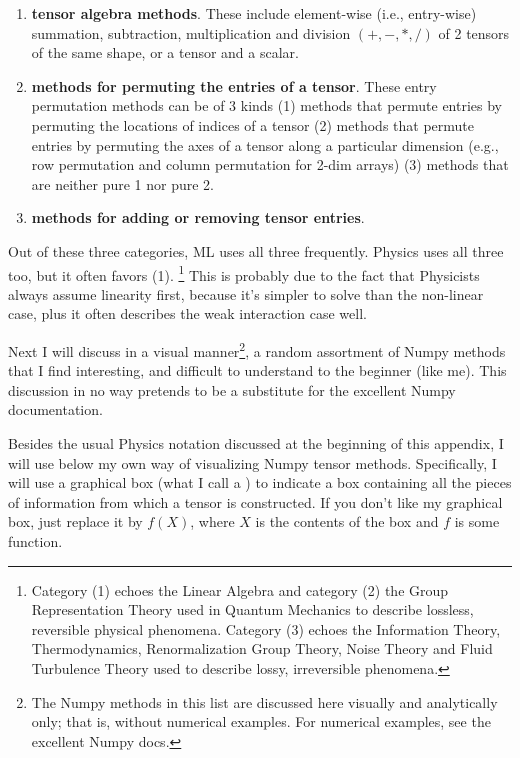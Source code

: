 \begin{enumerate}

\item {\bf tensor algebra methods}. These include
element-wise (i.e., entry-wise) summation, subtraction, multiplication and
division $(+,-,*,/)$ of 2 tensors of the same shape, or a tensor and a scalar.

\item
{\bf methods
for permuting  the entries of a tensor}. These
 entry permutation methods
 can be of 3 kinds
 (1) methods that
 permute entries by permuting the  locations of indices of a tensor
 (2) methods  that
 permute entries by permuting the  axes
 of a tensor along
 a particular dimension
 (e.g., row permutation and column permutation for 2-dim arrays)
(3) methods that
are neither pure 1 nor pure 2.

\item {\bf methods for adding or
removing tensor entries}.
\end{enumerate}
Out of these three categories, ML uses all three frequently.  Physics uses all three too, but it often favors (1). \footnote{
Category (1) echoes the Linear Algebra and category (2) the Group Representation Theory used in Quantum Mechanics to describe lossless, reversible physical phenomena. Category (3) echoes the Information Theory, Thermodynamics, Renormalization Group Theory, Noise Theory and Fluid Turbulence Theory used to describe lossy, irreversible phenomena.} This is
probably due to the fact
that Physicists always assume linearity  first, because it's  simpler to solve than the non-linear case, plus it often describes the weak interaction case well.

Next I will discuss in a visual manner\footnote{The Numpy methods in this list are discussed here visually and analytically only; that is, without numerical examples. For numerical examples, see the excellent Numpy docs.}, a random
assortment of Numpy
methods that I find interesting, and difficult to understand to the beginner (like me). This discussion in no way pretends to be
a substitute for the excellent Numpy documentation.

Besides the usual Physics notation
discussed at the beginning of this appendix, I will
use below my own way of visualizing Numpy tensor methods. Specifically, I will
use a graphical box (what I call a ) to indicate
a box containing all the pieces of information
from which a tensor is constructed.
If you don't like my graphical box,
just replace it by $f(X)$,
where $X$ is the contents of the box and
$f$ is some function.

